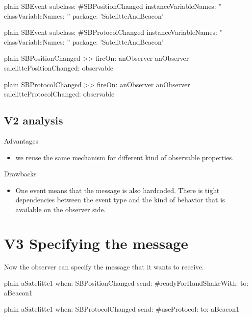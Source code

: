 \documentclass[10pt,twoside,english]{_support/latex/sbabook/sbabook}
\begin{document}
\begin{displaycode}{plain}
SBEvent subclass: #SBPositionChanged
	instanceVariableNames: ''
	classVariableNames: ''
	package: 'SatelitteAndBeacon'
\end{displaycode}

\begin{displaycode}{plain}
SBEvent subclass: #SBProtocolChanged
	instanceVariableNames: ''
	classVariableNames: ''
	package: 'SatelitteAndBeacon'
\end{displaycode}

\begin{displaycode}{plain}
SBPositionChanged >> fireOn: anObserver
	anObserver salelittePositionChanged: observable
\end{displaycode}

\begin{displaycode}{plain}
SBProtocolChanged >> fireOn: anObserver
	anObserver salelitteProtocolChanged: observable
\end{displaycode}
\subsection{V2 analysis}
Advantages

\begin{itemize}
\item we reuse the same mechanism for different kind of observable properties.
\end{itemize}

Drawbacks

\begin{itemize}
\item One event means that the message is also hardcoded. There is tight dependencies between  the event type and the kind of behavior that is available on the observer side. 
\end{itemize}
\section{V3 Specifying the message}
Now the observer can specify the message that it wants to receive. 

\begin{displaycode}{plain}
aSatelitte1 when: SBPositionChanged send: #readyForHandShakeWith: to: aBeacon1
\end{displaycode}

\begin{displaycode}{plain}
aSatelitte1 when: SBProtocolChanged send: #useProtocol: to: aBeacon1
\end{displaycode}
\end{document}
